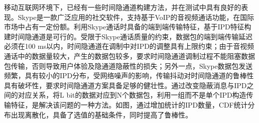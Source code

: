 
移动互联网环境下，已经有一些时间隐通道构建方法，并在测试中具有良好的表现。Skype是一款广泛应用的社交软件，支持基于VoIP的音视频通话功能，在国际市场中占有一定份额。利用Skype通话时具备的端到端传输特征，基于IPD特征构建时间隐通道是可行的。受限于Skype通话质量的约束，数据包的端到端传输延迟必须在100 ms以内，时间隐通道在调制中对IPD的调整具有上限约束；由于音视频通话中的数据量较大，产生的数据包较多，要求时间隐通道调制过程不能阻塞数据包传输，否则导致用户体验及隐通道隐蔽性的损失；另外一点，Skype数据包发送频繁，具有较小的IPD分布，受网络噪声的影响，传输抖动对时间隐通道的鲁棒性具有破坏性，要求时间隐通道方案具备足够的健壮性。通过改变隐蔽消息与IPD之间的对应关系，将L bit的数据对应到N个数据包，利用一组而不是单个IPD构造传输特征，是解决该问题的一种方法。如图，通过增加统计的IPD数量，CDF统计分布出现离散化，具备了选值的基础条件，同时提高了鲁棒性。


